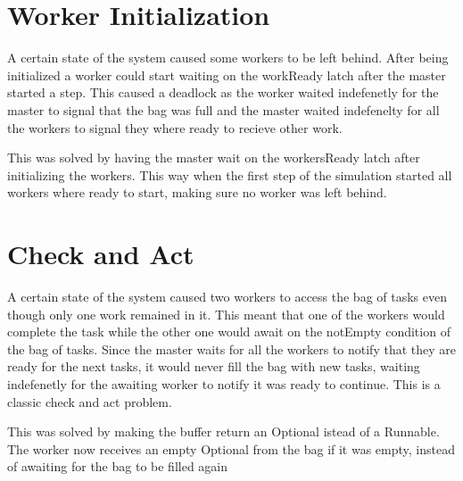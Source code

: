 \documentclass[12pt, a4paper]{report}
\begin{document}
\section{Worker Initialization}
A certain state of the system caused some workers to be left behind.
 After being initialized a worker could start waiting on the workReady latch after
 the master started a step. This caused a deadlock as the worker waited indefenetly
 for the master to signal that the bag was full and the master waited indefenelty for
 all the workers to signal they where ready to recieve other work.

This was solved by having the master wait on the workersReady latch after initializing
 the workers. This way when the first step of the simulation started all workers where
 ready to start, making sure no worker was left behind.

\section{Check and Act}
A certain state of the system caused two workers to access the bag of tasks even though
 only one work remained in it. This meant that one of the workers would complete the task
 while the other one would await on the notEmpty condition of the bag of tasks. Since the
 master waits for all the workers to notify that they are ready for the next tasks, it would
 never fill the bag with new tasks, waiting indefenetly for the awaiting worker to notify
 it was ready to continue. This is a classic check and act problem.
 
This was solved by making the buffer return an Optional istead of a Runnable. The worker
 now receives an empty Optional from the bag if it was empty, instead of awaiting for the
 bag to be filled again



\end{document}

